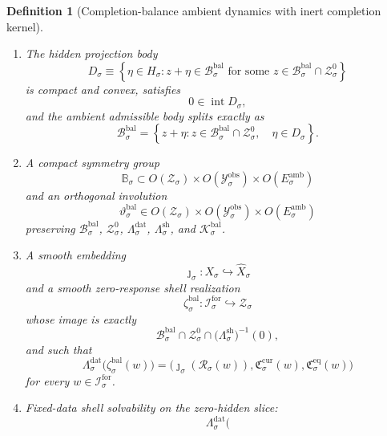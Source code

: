 \documentclass[11pt]{article}
\newcommand{\ForSpace}[1]{\mathcal I_{#1}^{\mathrm{for}}}
\newcommand{\Reduction}[1]{\mathcal R_{#1}}
\newcommand{\CurrentCarrier}[1]{\mathfrak C_{#1}^{\mathrm{cur}}}
\newcommand{\EqCarrier}[1]{\mathfrak C_{#1}^{\mathrm{eq}}}
\newcommand{\VisibleAffine}[1]{\widehat X_{#1}}
\newcommand{\DataSpace}[1]{\mathcal Y_{#1}^{\mathrm{obs}}}
\newcommand{\AmbientTarget}[1]{E_{#1}^{\mathrm{amb}}}
\newcommand{\BalSpace}[1]{\mathcal Z_{#1}}
\newcommand{\BalBody}[1]{\mathcal B_{#1}^{\mathrm{bal}}}
\newcommand{\BalData}[1]{\Lambda_{#1}^{\mathrm{dat}}}
\newcommand{\BalShell}[1]{\Lambda_{#1}^{\mathrm{sh}}}
\newcommand{\ZeroHiddenSlice}[1]{\mathcal Z_{#1}^{0}}
\newcommand{\BalOp}[1]{\mathcal K_{#1}^{\mathrm{bal}}}
\newcommand{\BalSym}[1]{\mathbb B_{#1}}
\newcommand{\BalTime}[1]{\vartheta_{#1}^{\mathrm{bal}}}
\newcommand{\BalEmbed}[1]{\zeta_{#1}^{\mathrm{bal}}}
\newcommand{\GapSpace}[1]{H_{#1}}
\newcommand{\GapBody}[1]{D_{#1}}
\newtheorem{definition}{Definition}
\begin{document}
\begin{definition}[Completion-balance ambient dynamics with inert completion kernel]
\begin{enumerate}
    \begin{equation}
    \ev{\eta,\BalOp{\sigma}\eta}
    \ge
    \kappa_{\sigma}^{\mathrm{hid}}\,
    \|\eta\|^{2}
    \qquad
    \text{for all }\eta\in\GapSpace{\sigma}
    \label{eq:ambientgap}
    \end{equation}
    for some \(\kappa_{\sigma}^{\mathrm{hid}}>0\).
    \item The hidden projection body
    \[
    \GapBody{\sigma}
    \equiv
    \left\{
    \eta\in\GapSpace{\sigma}:
    z+\eta\in\BalBody{\sigma}
    \text{ for some }z\in \BalBody{\sigma}\cap\ZeroHiddenSlice{\sigma}
    \right\}
    \]
    is compact and convex, satisfies
    \[
    0\in\operatorname{int}\GapBody{\sigma},
    \]
    and the ambient admissible body splits exactly as
    \begin{equation}
    \BalBody{\sigma}
    =
    \left\{
    z+\eta:
    z\in\BalBody{\sigma}\cap\ZeroHiddenSlice{\sigma},
    \quad
    \eta\in\GapBody{\sigma}
    \right\}.
    \label{eq:bodysplitting}
    \end{equation}
    \item A compact symmetry group
    \[
    \BalSym{\sigma}\subset
    O(\BalSpace{\sigma})\times
    O(\DataSpace{\sigma})\times
    O(\AmbientTarget{\sigma})
    \]
    and an orthogonal involution
    \[
    \BalTime{\sigma}\in
    O(\BalSpace{\sigma})\times
    O(\DataSpace{\sigma})\times
    O(\AmbientTarget{\sigma})
    \]
    preserving \(\BalBody{\sigma}\), \(\ZeroHiddenSlice{\sigma}\), \(\BalData{\sigma}\), \(\BalShell{\sigma}\), and \(\BalOp{\sigma}\).
    \item A smooth embedding
    \[
    \jmath_{\sigma}:X_{\sigma}\hookrightarrow\VisibleAffine{\sigma}
    \]
    and a smooth zero-response shell realization
    \[
    \BalEmbed{\sigma}:\ForSpace{\sigma}\hookrightarrow\BalSpace{\sigma}
    \]
    whose image is exactly
    \[
    \BalBody{\sigma}\cap
    \ZeroHiddenSlice{\sigma}\cap
    \bigl(\BalShell{\sigma}\bigr)^{-1}(0),
    \]
    and such that
    \begin{equation}
    \BalData{\sigma}\bigl(\BalEmbed{\sigma}(w)\bigr)
    =
    \bigl(
    \jmath_{\sigma}(\Reduction{\sigma}(w)),
    \CurrentCarrier{\sigma}(w),
    \EqCarrier{\sigma}(w)
    \bigr)
    \label{eq:ambientcompat}
    \end{equation}
    for every \(w\in\ForSpace{\sigma}\).
    \item Fixed-data shell solvability on the zero-hidden slice:
    \begin{equation}
    \BalData{\sigma}\bigl(

\end{equation}
\end{enumerate}
\end{definition}
\end{document}
